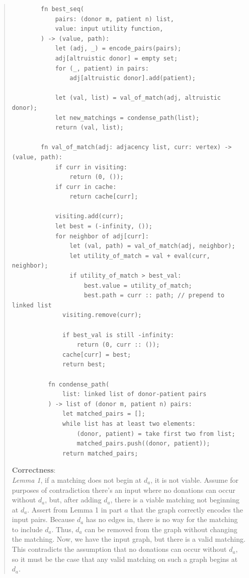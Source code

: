 \documentclass[11pt]{article}
\begin{document}
\begin{enumerate}
\begin{enumerate}
\begin{quote}
\begin{verbatim}
        fn best_seq(
            pairs: (donor m, patient n) list,
            value: input utility function,
        ) -> (value, path):
            let (adj, _) = encode_pairs(pairs);
            adj[altruistic donor] = empty set;
            for (_, patient) in pairs:
                adj[altruistic donor].add(patient);

            let (val, list) = val_of_match(adj, altruistic donor);
            let new_matchings = condense_path(list);
            return (val, list);

        fn val_of_match(adj: adjacency list, curr: vertex) -> (value, path):
            if curr in visiting:
                return (0, ());
            if curr in cache:
                return cache[curr];

            visiting.add(curr);
            let best = (-infinity, ());
            for neighbor of adj[curr]:
                let (val, path) = val_of_match(adj, neighbor);
                let utility_of_match = val + eval(curr, neighbor);
                if utility_of_match > best_val:
                    best.value = utility_of_match;
                    best.path = curr :: path; // prepend to linked list
              visiting.remove(curr);

              if best_val is still -infinity:
                  return (0, curr :: ());
              cache[curr] = best;
              return best;

          fn condense_path(
              list: linked list of donor-patient pairs
          ) -> list of (donor m, patient n) pairs:
              let matched_pairs = [];
              while list has at least two elements: 
                  (donor, patient) = take first two from list;
                  matched_pairs.push((donor, patient));
              return matched_pairs;
        \end{verbatim}


      \medskip
        \textbf{Correctness}: \\ 
      \textit{Lemma 1}, if a matching does not begin at $d_a$, it is not viable. Assume for purposes of contradiction there's an input where no donations can occur without $d_a$, but, after adding $d_a$, there is a viable matching not beginning at $d_a$. Assert from Lemma 1 in part $a$ that the graph correctly encodes the input pairs. Because $d_a$ has no edges in, there is no way for the matching to include $d_a$. Thus, $d_a$ can be removed from the graph without changing the matching. Now, we have the input graph, but there is a valid matching. This contradicts the assumption that no donations can occur without $d_a$, so it must be the case that any valid matching on such a graph begins at $d_a$.


\end{quote}
\end{enumerate}
\end{enumerate}
\end{document}
